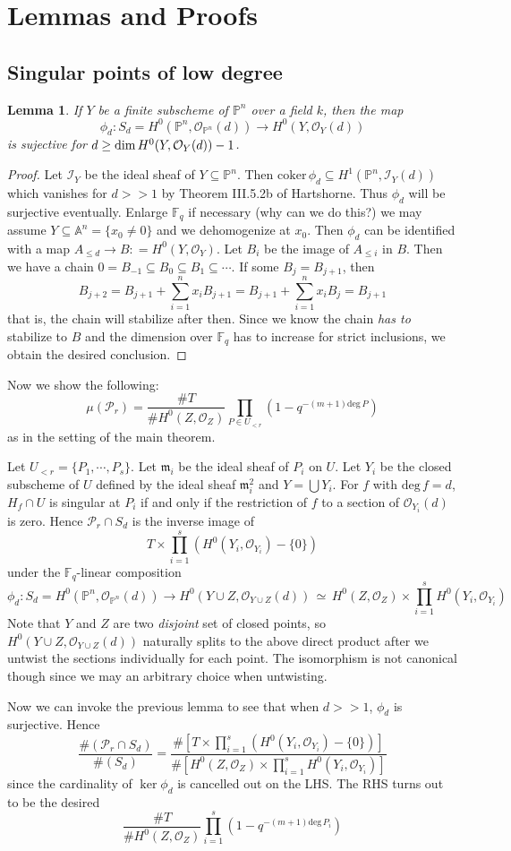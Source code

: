 \documentclass[12pt]{article}
\theoremstyle{plain}
\newtheorem{lemma}[equation]{Lemma}
\theoremstyle{definition}
\newcommand{\fm}{\mathfrak{m}}
\newcommand{\IA}{\mathbb{A}}
\newcommand{\IF}{\mathbb{F}}
\newcommand{\IP}{\mathbb{P}}
\newcommand{\sI}{\mathcal{I}}
\newcommand{\sO}{\mathcal{O}}
\newcommand{\sP}{\mathcal{P}}
\renewcommand{\deg}{\mathrm{deg}\,}
\renewcommand\dim{{\rm dim\,}}
\newcommand\iso{{\, \simeq \,}}
\newcommand\union{\bigcup}
\newcommand{\<}{\langle}
\renewcommand{\>}{\rangle}
\begin{document}
\section{Lemmas and Proofs}
\subsection{Singular points of low degree}

\begin{lemma}
\label{surj}
If $Y$ be a finite subscheme of $\IP^n$ over a field $k$, then the map 
$$ \phi_d : S_d = H^0(\IP^n, \sO_{\IP^n}(d)) \to H^0(Y, \sO_Y(d))$$
is sujective for $d \ge \dim H^0(Y, \sO_Y(d)) - 1$. 
\end{lemma}
\begin{proof}
Let $\sI_Y$ be the ideal sheaf of $Y \subseteq \IP^n$. Then $\mathrm{coker}\, \phi_d \subseteq H^1(\IP^n, \sI_Y(d))$ which vanishes for $d >> 1$ by Theorem III.5.2b of Hartshorne. Thus $\phi_d$ will be surjective eventually. 
Enlarge $\IF_q$ if necessary (why can we do this?) we may assume $Y \subseteq \IA^n = \{ x_0 \neq 0 \}$ and we dehomogenize at $x_0$. Then $\phi_d$ can be identified with a map $A_{\le d} \to B : = H^0(Y, \sO_Y)$. Let $B_i$ be the image of $A_{\le i}$ in $B$. Then we have a chain $0 = B_{-1} \subseteq B_0 \subseteq B_1 \subseteq \cdots $. If some $B_j = B_{j+1}$, then 
$$ B_{j+2} = B_{j+1} + \sum_{i=1}^n x_i B_{j+1} =B_{j+1} + \sum_{i=1}^n x_i B_j = B_{j+1} $$ that is, the chain will stabilize after then. Since we know the chain \textit{has to} stabilize to $B$ and the dimension over $\IF_q$ has to increase for strict inclusions, we obtain the desired conclusion. 
\end{proof}
Now we show the following:
$$\mu(\sP_r) = \frac{\# T}{\# H^0(Z, \sO_Z)} \prod_{P \in U_{<r}} (1 - q^{-(m+1)\deg P})$$
as in the setting of the main theorem. 
\par Let $U_{<r} = \{P_1, \cdots, P_s\}$. Let $\fm_i$ be the ideal sheaf of $P_i$ on $U$. Let $Y_i$ be the closed subscheme of $U$ defined by the ideal sheaf $\fm_i^2$ and $Y = \union Y_i$. For $f$ with $\deg f = d$, $H_f \cap U$ is singular at $P_i$ if and only if the restriction of $f$ to a section of $\sO_{Y_i}(d)$ is zero. Hence $\sP_r \cap S_d$ is the inverse image of 
$$T \times \prod_{i=1}^s(H^0(Y_i, \sO_{Y_i}) - \{0\})$$
under the $\IF_q$-linear composition 
$$ \phi_d : S_d = H^0(\IP^n, \sO_{\IP^n}(d)) \to H^0(Y \cup Z, \sO_{Y \cup Z}(d)) \iso H^0(Z, \sO_Z) \times \prod_{i=1}^s H^0(Y_i, \sO_{Y_i}) $$
Note that $Y$ and $Z$ are two \textit{disjoint} set of closed points, so $H^0(Y \cup Z, \sO_{Y \cup Z}(d))$ naturally splits to the above direct product after we untwist the sections individually for each point. The isomorphism is not canonical though since we may an arbitrary choice when untwisting. 
\par Now we can invoke the previous lemma to see that when $d >> 1$, $\phi_d$ is surjective. Hence 
$$ \frac{\#(\sP_r \cap S_d)}{\#(S_d)} = \frac{\#[T \times \prod_{i=1}^s (H^0(Y_i, \sO_{Y_i}) - \{0\})]}{\#[H^0(Z, \sO_Z) \times \prod_{i=1}^s H^0(Y_i, \sO_{Y_i})]}$$
since the cardinality of $\ker \phi_d$ is cancelled out on the LHS. The RHS turns out to be the desired 
$$\frac{\# T}{\# H^0(Z, \sO_Z)} \prod_{i=1}^s (1 - q^{-(m+1)\deg P_i})$$
\end{document}
